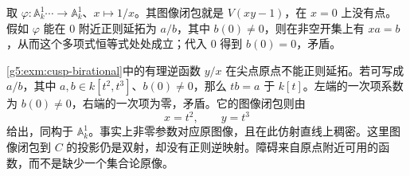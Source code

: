 \begin{example}\label{g5:exm:graph-missing-point}
	取 \(\varphi:\mathbb A_k^1\mathrel{\cdots\!\rightarrow}\mathbb A_k^1\)、\(x\mapsto1/x\)。其图像闭包就是 \(V(xy-1)\)，在 \(x=0\) 上没有点。假如 \(\varphi\) 能在 \(0\) 附近正则延拓为 \(a/b\)，其中 \(b(0)\ne0\)，则在非空开集上有 \(xa=b\)，从而这个多项式恒等式处处成立；代入 \(0\) 得到 \(b(0)=0\)，矛盾。
\end{example}

\begin{example}\label{g5:exm:cusp-local-obstruction}
	\cref{g5:exm:cusp-birational}中的有理逆函数 \(y/x\) 在尖点原点不能正则延拓。若可写成 \(a/b\)，其中 \(a,b\in k[t^2,t^3]\)、\(b(0)\ne0\)，那么 \(tb=a\) 于 \(k[t]\)。左端的一次项系数为 \(b(0)\ne0\)，右端的一次项为零，矛盾。它的图像闭包则由
	\[
		x=t^2,\qquad y=t^3
	\]
	给出，同构于 \(\mathbb A_k^1\)。事实上非零参数对应原图像，且在此仿射直线上稠密。这里图像闭包到 \(C\) 的投影仍是双射，却没有正则逆映射。障碍来自原点附近可用的函数，而不是缺少一个集合论原像。
\end{example}

